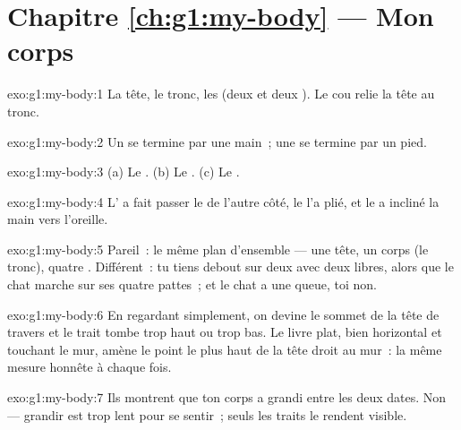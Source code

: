 \section*{Chapitre \ref{ch:g1:my-body} --- Mon corps}

\begin{solution}{exo:g1:my-body:1}
La tête, le tronc, les  (deux  et deux ). Le cou
relie la tête au tronc.
\end{solution}

\begin{solution}{exo:g1:my-body:2}
Un  se termine par une main~; une  se termine par un pied.
\end{solution}

\begin{solution}{exo:g1:my-body:3}
(a) Le . (b) Le . (c) Le .
\end{solution}

\begin{solution}{exo:g1:my-body:4}
L' a fait passer le  de l'autre côté, le  l'a plié,
et le  a incliné la main vers l'oreille.
\end{solution}

\begin{solution}{exo:g1:my-body:5}
Pareil~: le même plan d'ensemble --- une tête, un corps (le tronc),
quatre . Différent~: tu tiens debout sur deux  avec
deux  libres, alors que le chat marche sur ses quatre pattes~;
et le chat a une queue, toi non.
\end{solution}

\begin{solution}{exo:g1:my-body:6}
En regardant simplement, on devine le sommet de la tête de travers
et le trait tombe trop haut ou trop bas. Le livre plat, bien
horizontal et touchant le mur, amène le point le plus haut de la
tête droit au mur~: la même mesure honnête à chaque fois.
\end{solution}

\begin{solution}{exo:g1:my-body:7}
Ils montrent que ton corps a grandi entre les deux dates. Non ---
grandir est trop lent pour se sentir~; seuls les traits le rendent
visible.
\end{solution}

